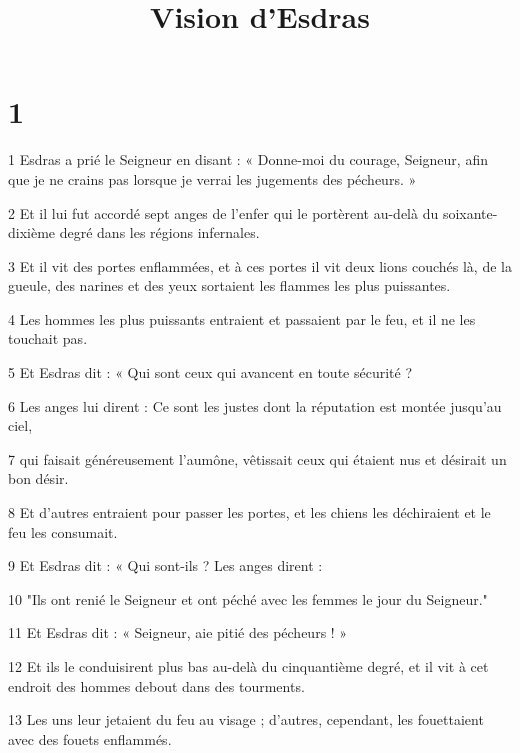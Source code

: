 

\title{Vision d'Esdras}

\chapter{1}

\par 1 Esdras a prié le Seigneur en disant : « Donne-moi du courage, Seigneur, afin que je ne crains pas lorsque je verrai les jugements des pécheurs. »

\par 2 Et il lui fut accordé sept anges de l'enfer qui le portèrent au-delà du soixante-dixième degré dans les régions infernales.

\par 3 Et il vit des portes enflammées, et à ces portes il vit deux lions couchés là, de la gueule, des narines et des yeux sortaient les flammes les plus puissantes.

\par 4 Les hommes les plus puissants entraient et passaient par le feu, et il ne les touchait pas.

\par 5 Et Esdras dit : « Qui sont ceux qui avancent en toute sécurité ?

\par 6 Les anges lui dirent : Ce sont les justes dont la réputation est montée jusqu'au ciel,

\par 7 qui faisait généreusement l'aumône, vêtissait ceux qui étaient nus et désirait un bon désir.

\par 8 Et d'autres entraient pour passer les portes, et les chiens les déchiraient et le feu les consumait.

\par 9 Et Esdras dit : « Qui sont-ils ? Les anges dirent :

\par 10 "Ils ont renié le Seigneur et ont péché avec les femmes le jour du Seigneur."

\par 11 Et Esdras dit : « Seigneur, aie pitié des pécheurs ! »

\par 12 Et ils le conduisirent plus bas au-delà du cinquantième degré, et il vit à cet endroit des hommes debout dans des tourments.

\par 13 Les uns leur jetaient du feu au visage ; d'autres, cependant, les fouettaient avec des fouets enflammés.


